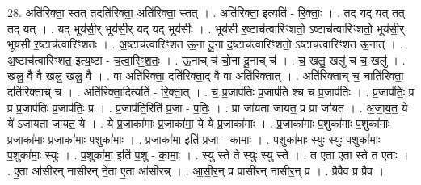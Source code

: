 \documentclass[17pt]{extarticle}
\begin{document}
28. अति॑रिक्ता॒ स्तत् तदति॑रिक्ता॒ अति॑रिक्ता॒ स्तत् । . अति॑रिक्ता॒ इत्यति॑ - रि॒क्ताः॒ । . तद् यद् यत् तत् तद् यत् । . यद् भूय॑सी॒र् भूय॑सी॒र् यद् यद् भूय॑सीः । . भूय॑सी र॒ष्टाच॑त्वारिꣳशतो॒ ऽष्टाच॑त्वारिꣳशतो॒ भूय॑सी॒र् भूय॑सी र॒ष्टाच॑त्वारिꣳशतः । . अ॒ष्टाच॑त्वारिꣳशत ऊ॒ना दू॒ना द॒ष्टाच॑त्वारिꣳशतो॒ ऽष्टाच॑त्वारिꣳशत ऊ॒नात् । . अ॒ष्टाच॑त्वारिꣳशत॒ इत्य॒ष्टा - च॒त्वा॒रिꣳ॒॒श॒तः॒ । . ऊ॒नाच् च॑ चो॒ना दू॒नाच् च॑ । . च॒ खलु॒ खलु॑ च च॒ खलु॑ । . खलु॒ वै वै खलु॒ खलु॒ वै । . वा अति॑रिक्ता॒ दति॑रिक्ता॒द् वै वा अति॑रिक्तात् । . अति॑रिक्ताच् च॒ चाति॑रिक्ता॒ दति॑रिक्ताच् च । . अति॑रिक्ता॒दित्यति॑ - रि॒क्ता॒त् । . च॒ प्र॒जाप॑तिः प्र॒जाप॑ति श्च च प्र॒जाप॑तिः । . प्र॒जाप॑तिः॒ प्र प्र प्र॒जाप॑तिः प्र॒जाप॑तिः॒ प्र । . प्र॒जाप॑ति॒रिति॑ प्र॒जा - प॒तिः॒ । . प्रा जा॑यता जायत॒ प्र प्रा जा॑यत । . अ॒जा॒य॒त॒ ये ये॑ ऽजायता जायत॒ ये । . ये प्र॒जाका॑माः प्र॒जाका॑मा॒ ये ये प्र॒जाका॑माः । . प्र॒जाका॑माः प॒शुका॑माः प॒शुका॑माः प्र॒जाका॑माः प्र॒जाका॑माः प॒शुका॑माः । . प्र॒जाका॑मा॒ इति॑ प्र॒जा - का॒माः॒ । . प॒शुका॑माः॒ स्युः स्युः प॒शुका॑माः प॒शुका॑माः॒ स्युः । . प॒शुका॑मा॒ इति॑ प॒शु - का॒माः॒ । . स्यु स्ते ते स्युः स्यु स्ते । . त ए॒ता ए॒ता स्ते त ए॒ताः । . ए॒ता आ॑सीरन् नासीरन् ने॒ता ए॒ता आ॑सीरन्न् । . आ॒सी॒र॒न् प्र प्रासी॑रन् नासीर॒न् प्र । . प्रैवैव प्र प्रैव । \newline
\end{document}
